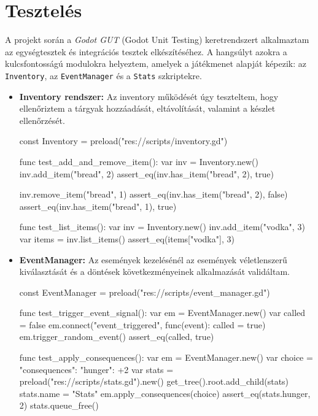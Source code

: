 \documentclass[12pt,a4paper]{article}
\begin{document}
\section{Tesztelés}

A projekt során a \emph{Godot GUT} (Godot Unit Testing) \cite{godot_gut} keretrendszert alkalmaztam az egységtesztek és integrációs tesztek elkészítéséhez. A hangsúlyt azokra a kulcsfontosságú modulokra helyeztem, amelyek a játékmenet alapját képezik: az \texttt{Inventory}, az \texttt{EventManager} és a \texttt{Stats} szkriptekre.

\begin{itemize}
    \item \textbf{Inventory rendszer:} Az inventory működését úgy teszteltem, hogy ellenőriztem a tárgyak hozzáadását, eltávolítását, valamint a készlet ellenőrzését.  
    \begin{python}
    const Inventory = preload("res://scripts/inventory.gd")

    func test_add_and_remove_item():
        var inv = Inventory.new()
        inv.add_item("bread", 2)
        assert_eq(inv.has_item("bread", 2), true)

        inv.remove_item("bread", 1)
        assert_eq(inv.has_item("bread", 2), false)
        assert_eq(inv.has_item("bread", 1), true)

    func test_list_items():
        var inv = Inventory.new()
        inv.add_item("vodka", 3)
        var items = inv.list_items()
        assert_eq(items["vodka"], 3)
    \end{python}

    \item \textbf{EventManager:} Az események kezelésénél az események véletlenszerű kiválasztását és a döntések következményeinek alkalmazását validáltam.  
    \begin{python}
    const EventManager = preload("res://scripts/event_manager.gd")

    func test_trigger_event_signal():
        var em = EventManager.new()
        var called = false
        em.connect("event_triggered", func(event): called = true)
        em.trigger_random_event()
        assert_eq(called, true)

    func test_apply_consequences():
        var em = EventManager.new()
        var choice = {"consequences": {"hunger": +2}}
        var stats = preload("res://scripts/stats.gd").new()
        get_tree().root.add_child(stats)
        stats.name = "Stats"
        em.apply_consequences(choice)
        assert_eq(stats.hunger, 2)
        stats.queue_free()
    \end{python}


\end{itemize}
\end{document}
